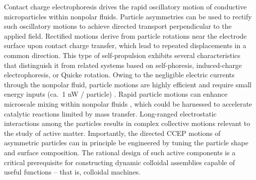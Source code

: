 Contact charge electrophoresis drives the rapid oscillatory motion of conductive microparticles within nonpolar fluids.
Particle asymmetries can be used to rectify such oscillatory motions to achieve directed transport perpendicular to the applied field.
Rectified motions derive from particle rotations near the electrode surface upon contact charge transfer, which lead to repeated displacements in a common direction.
This type of self-propulsion exhibits several characteristics that distinguish it from related systems based on self-phoresis, induced-charge electrophoresis, or Quicke rotation.
Owing to the negligible electric currents through the nonpolar fluid, particle motions are highly efficient and require small energy inputs (ca.~1 nW / particle) \cite{drews2015contact}. 
Rapid particle motions can enhance microscale mixing within nonpolar fluids \cite{cartier2014microfluidic}, which could be harnessed to accelerate catalytic reactions limited by mass transfer.
Long-ranged electrostatic interactions among the particles results in complex collective motions relevant to the study of active matter.
Importantly, the directed CCEP motions of asymmetric particles can in principle be engineered by tuning the particle shape and surface composition.
The rational design of such active components is a critical prerequisite for constructing dynamic colloidal assemblies capable of useful functions -- that is, colloidal machines.









